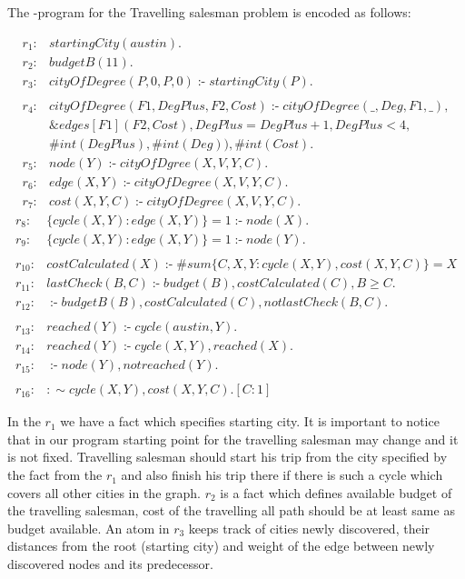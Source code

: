 \documentclass[14pt,a4paper, titlepage]{article}
\newcommand{\ext}[3]{\ensuremath{\&{#1}[#2](#3)}}
\DeclareMathOperator{\leftimpl}{:-}
\begin{document}
The \hex{}-program for the Travelling salesman problem is encoded as follows:
\begin{exmp}
\begin{align*}
r_1\colon & startingCity(austin).\\
r_2\colon & budgetB(11).\\
r_3\colon & \mathit{cityOfDegree(P,0,P,0)} \leftimpl \mathit{startingCity(P).} \\
& \\
r_4\colon & \mathit{cityOfDegree(F1, DegPlus, F2, Cost)} \leftimpl \mathit{cityOfDegree(\_, Deg, F1, \_)}, \\ &\ext{edges}{F1}{F2, Cost}, \mathit{DegPlus=DegPlus+1}, DegPlus < 4, \\ & \#int(DegPlus), \#int(Deg)), \#int(Cost). \\
r_5\colon& \mathit{node(Y)} \leftimpl \mathit{cityOfDgree(X, V, Y, C)}.\\
r_6\colon& \mathit{edge}(X, Y) \leftimpl \mathit{cityOfDegree(X, V, Y, C).} \\
r_7\colon & cost(X,Y,C) \leftimpl cityOfDegree(X, V, Y, C). \end{align*}
\begin{align*}
r_8 \colon & \{ cycle(X,Y) : edge(X,Y) \} = 1 \leftimpl node(X). \\
r_{9} \colon &  \{ cycle(X,Y) : edge(X,Y) \} = 1 \leftimpl node(Y). \\
& \\
r_{10} \colon & costCalculated(X) \leftimpl \#sum \{C,X,Y : cycle(X,Y), cost(X,Y,C)\} = X \\
r_{11} \colon & lastCheck(B,C) \leftimpl budget(B), costCalculated(C), B \geq C. \\
r_{12} \colon & \leftimpl  budgetB(B), costCalculated(C), \mathit{not} \mathit{lastCheck(B,C).} \\
& \\
r_{13} \colon & reached(Y) \leftimpl cycle(austin, Y). \\
r_{14} \colon & reached(Y) \leftimpl cycle(X,Y), reached(X). \\
r_{15} \colon & \leftimpl node(Y), \mathit{not} \mathit{reached(Y)}. \\
& \\
r_{16} \colon & :\sim cycle(X,Y), cost(X,Y,C). [C:1] 
\end{align*}
\end{exmp}
In the $r_1$ we have a fact which specifies starting city. It is important to notice that in our program starting point for the travelling salesman may change and it is not fixed. Travelling salesman should start his trip from the city specified by the fact from the $r_1$ and also finish his trip there if there is such a cycle which covers all other cities in the graph. $r_2$ is a fact which defines available budget of the travelling salesman, cost of the travelling all path should be at least same as budget available. An atom in $r_3$ keeps track of cities newly discovered, their distances from the root (starting city) and weight of the edge between newly discovered nodes and its predecessor. 
\end{document}
